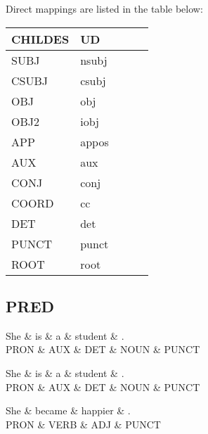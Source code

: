 Direct mappings are listed in the table below:
\begin{table}[h!]
\begin{tabular}{@{}lllll@{}}
\toprule
\textbf{CHILDES} & \textbf{UD} & \\ \midrule
SUBJ & nsubj & \\
CSUBJ & csubj & \\
OBJ & obj & \\
OBJ2 & iobj & \\
APP & appos & \\
AUX & aux & \\
CONJ & conj & \\
COORD & cc & \\
DET & det & \\
PUNCT & punct & \\
ROOT & root & \\\bottomrule
\end{tabular}
\end{table}


\subsection{PRED}
\begin{dependency}
	\begin{deptext}
	She \& is \& a \& student \& .\\
	PRON \& AUX \& DET \& NOUN \& PUNCT\\
	\end{deptext}
\end{dependency}

\begin{dependency}
	\begin{deptext}
	She \& is \& a \& student \& .\\
	PRON \& AUX \& DET \& NOUN \& PUNCT\\
	\end{deptext}
\end{dependency}

\begin{dependency}
	\begin{deptext}
	She \& became \& happier \& .\\
	PRON \& VERB \& ADJ \& PUNCT\\
	\end{deptext}
\end{dependency}

